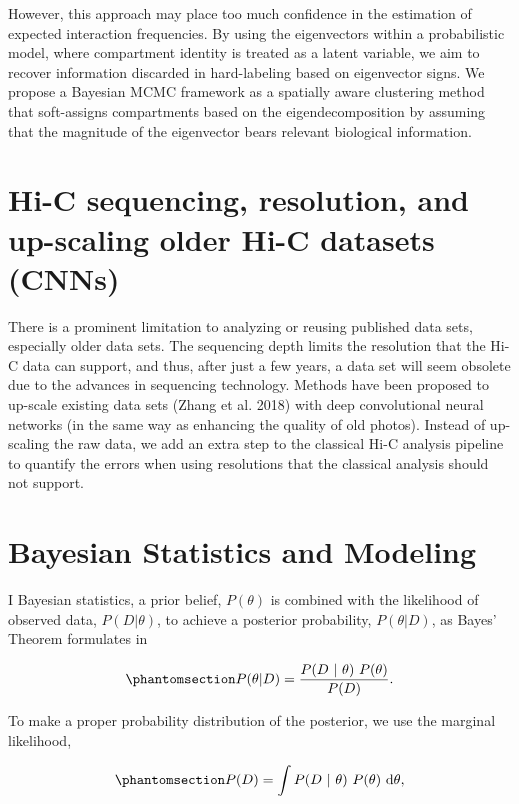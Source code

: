 \documentclass[
  10pt,
  a4paper,
  openany]{scrbook}
\begin{document}
However, this approach may place too much confidence in the estimation
of expected interaction frequencies. By using the eigenvectors within a
probabilistic model, where compartment identity is treated as a latent
variable, we aim to recover information discarded in hard-labeling based
on eigenvector signs. We propose a Bayesian MCMC framework as a
spatially aware clustering method that soft-assigns compartments based
on the eigendecomposition by assuming that the magnitude of the
eigenvector bears relevant biological information.

\section{Hi-C sequencing, resolution, and up-scaling older Hi-C datasets
(CNNs)}\label{hi-c-sequencing-resolution-and-up-scaling-older-hi-c-datasets-cnns}

There is a prominent limitation to analyzing or reusing published data
sets, especially older data sets. The sequencing depth limits the
resolution that the Hi-C data can support, and thus, after just a few
years, a data set will seem obsolete due to the advances in sequencing
technology. Methods have been proposed to up-scale existing data sets
(Zhang et al. 2018) with deep convolutional neural networks (in the same
way as enhancing the quality of old photos). Instead of up-scaling the
raw data, we add an extra step to the classical Hi-C analysis pipeline
to quantify the errors when using resolutions that the classical
analysis should not support.

\section{Bayesian Statistics and
Modeling}\label{bayesian-statistics-and-modeling}

I Bayesian statistics, a prior belief, \(P(\theta)\) is combined with
the likelihood of observed data, \(P(D|\theta)\), to achieve a posterior
probability, \(P(\theta|D)\), as Bayes' Theorem formulates in

\begin{equation}\phantomsection\label{eq-bayes-theorem}{ 
P(\theta | D) = \frac{P(D \ | \ \theta) \ P(\theta)}{P(D)}.
}\end{equation}

To make a proper probability distribution of the posterior, we use the
marginal likelihood,

\begin{equation}\phantomsection\label{eq-marginal-likelihood}{
P(D) =\int P(D \ | \ \theta) \ P(\theta) \ \mathrm{d}\theta,
}\end{equation}
\end{document}
